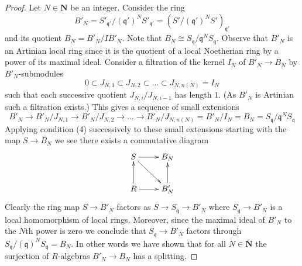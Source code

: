 \begin{proof}
\medskip\noindent
Let $N \in \mathbf{N}$ be an integer.
Consider the ring
$$
B'_N = S'_{\mathfrak q'} / (\mathfrak q')^N S'_{\mathfrak q'}
= (S'/(\mathfrak q')^N S')_{\mathfrak q'}
$$
and its quotient $B_N = B'_N/IB'_N$. Note that
$B_N \cong S_{\mathfrak q}/\mathfrak q^NS_{\mathfrak q}$.
Observe that $B'_N$ is an Artinian local ring since it is the
quotient of a local Noetherian ring by a power of its maximal ideal.
Consider a filtration of the kernel $I_N$ of $B'_N \to B_N$
by $B'_N$-submodules
$$
0 \subset J_{N, 1} \subset J_{N, 2} \subset \ldots \subset J_{N, n(N)} = I_N
$$
such that each successive quotient $J_{N, i}/J_{N, i - 1}$ has length $1$.
(As $B'_N$ is Artinian such a filtration exists.)
This gives a sequence of small extensions
$$
B'_N  \to B'_N/J_{N, 1} \to B'_N/J_{N, 2} \to \ldots \to
B'_N/J_{N, n(N)} = B'_N/I_N
= B_N = S_{\mathfrak q}/\mathfrak q^NS_{\mathfrak q}
$$
Applying condition (4) successively to these small extensions
starting with the map $S \to B_N$ we see there
exists a commutative diagram
$$
\xymatrix{
S \ar[r] \ar[rd] & B_N  \\
R \ar[r] \ar[u] & B'_N \ar[u]
}
$$
Clearly the ring map $S \to B'_N$ factors as $S \to S_{\mathfrak q} \to B'_N$
where $S_{\mathfrak q} \to B'_N$ is a local homomorphism of local rings.
Moreover, since the maximal ideal of $B'_N$ to the $N$th power is zero
we conclude that $S_{\mathfrak q} \to B'_N$ factors through
$S_{\mathfrak q}/(\mathfrak q)^NS_{\mathfrak q} = B_N$. In other words
we have shown that for all $N \in \mathbf{N}$ the surjection of
$R$-algebras $B'_N \to B_N$ has a splitting.


\end{proof}
